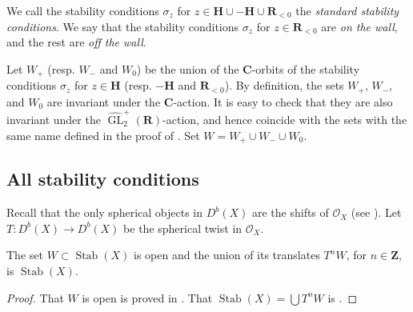 \documentclass{amsart}
\begin{document}
We call the stability conditions \(\sigma_z\) for \(z \in \mathbf{H} \cup -\mathbf{H} \cup \mathbf{R}_{<0}\) the \emph{standard stability conditions}.
We say that the stability conditions \(\sigma_z\) for \(z \in \mathbf{R}_{<0}\) are \emph{on the wall}, and the rest are \emph{off the wall}.


Let \(W_+\) (resp. \(W_-\) and \(W_0\)) be the union of the \(\mathbf{C}\)-orbits of the stability conditions \(\sigma_z\) for \(z \in \mathbf{H}\) (resp. \(-\mathbf{H}\) and \(\mathbf{R}_{<0}\)).
By definition, the sets \(W_+\), \(W_-\), and \(W_{0}\) are invariant under the \(\mathbf{C}\)-action.
It is easy to check that they are also invariant under the \(\widehat{\operatorname{GL}}_2^+(\mathbf{R})\)-action, and hence coincide with the sets with the same name defined in the proof of \cite[Theorem~4.8]{huy.mac.ste:08}.
Set \(W = W_+ \cup W_- \cup W_0\).

\subsection{All stability conditions}
Recall that the only spherical objects in \(D^b(X)\) are the shifts of \(\mathcal{O}_X\) (see \cite[Proposition~2.15]{huy.mac.ste:08}).
Let \(T \colon D^b(X) \to D^b(X)\) be the spherical twist in \(\mathcal{O}_X\).
\begin{proposition}\label{prop:Torbit}
  The set \(W \subset \operatorname{Stab}(X)\) is open and the union of its translates \(T^nW\), for \(n \in \mathbf{Z}\), is \(\operatorname{Stab}(X)\).
\end{proposition}
\begin{proof}
  That \(W\) is open is proved in \cite[Theorem~4.8]{huy.mac.ste:08}.
  That \(\operatorname{Stab}(X) = \bigcup T^nW\) is \cite[Corollary~4.7]{huy.mac.ste:08}.
\end{proof}
\end{document}
